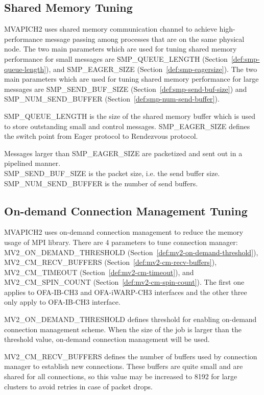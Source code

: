 \subsection {Shared Memory Tuning}
MVAPICH2 uses shared memory communication channel to achieve high-performance
message passing among processes that are on the same physical node. The two main
parameters which are used for tuning shared memory performance for small messages are
SMP\_QUEUE\_LENGTH (Section~\ref{def:smp-queue-length}), and
SMP\_EAGER\_SIZE (Section~\ref{def:smp-eagersize}). The two main
parameters which are used for tuning shared memory performance for large messages are
SMP\_SEND\_BUF\_SIZE (Section~\ref{def:smp-send-buf-size}) and \\
SMP\_NUM\_SEND\_BUFFER
(Section~\ref{def:smp-num-send-buffer}).

SMP\_QUEUE\_LENGTH is the size of the shared memory buffer which is used to store
outstanding small and control messages. SMP\_EAGER\_SIZE defines the
switch point from Eager protocol to Rendezvous protocol.

Messages larger than SMP\_EAGER\_SIZE are packetized and sent out in a pipelined manner.
\\SMP\_SEND\_BUF\_SIZE is the packet size, i.e. the send buffer size. SMP\_NUM\_SEND\_BUFFER
is the number of send buffers.

\subsection {On-demand Connection Management Tuning} MVAPICH2 uses
on-demand connection management to reduce the memory usage of MPI
library. There are 4 parameters to tune connection manager:
MV2\_ON\_DEMAND\_THRESHOLD
(Section~\ref{def:mv2-on-demand-threshold}),\\
MV2\_CM\_RECV\_BUFFERS (Section~\ref{def:mv2-cm-recv-buffers}),
MV2\_CM\_TIMEOUT (Section~\ref{def:mv2-cm-timeout}), and\\
MV2\_CM\_SPIN\_COUNT (Section~\ref{def:mv2-cm-spin-count}). The first
one applies to OFA-IB-CH3 and OFA-iWARP-CH3 interfaces and
the other three only apply to OFA-IB-CH3 interface.

MV2\_ON\_DEMAND\_THRESHOLD defines threshold for enabling on-demand
connection management scheme. When the size of the job is larger
than the threshold value, on-demand connection management will be
used.

MV2\_CM\_RECV\_BUFFERS defines the number of buffers used by
connection manager to establish new connections. These buffers are
quite small and are shared for all connections, so this value may be
increased to 8192 for large clusters to avoid retries in case of
packet drops.

